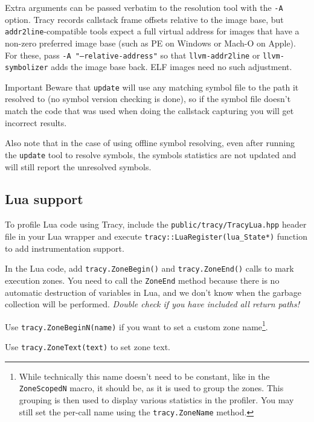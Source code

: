 \documentclass[hidelinks,titlepage,a4paper,twoside]{article}
\begin{document}
Extra arguments can be passed verbatim to the resolution tool with the \texttt{-A} option. Tracy
records callstack frame offsets relative to the image base, but \texttt{addr2line}-compatible
tools expect a full virtual address for images that have a non-zero preferred image base (such as
PE on Windows or Mach-O on Apple). For these, pass \texttt{-A "--relative-address"} so that
\texttt{llvm-addr2line} or \texttt{llvm-symbolizer} adds the image base back. ELF images need no
such adjustment.

\begin{bclogo}[
noborder=true,
couleur=black!5,
logo=\bcbombe
]{Important}
Beware that \texttt{update} will use any matching symbol file to the path it resolved to (no symbol version checking is done), so if the symbol file doesn't match the code that was used when doing the callstack capturing you will get incorrect results.

Also note that in the case of using offline symbol resolving, even after running the \texttt{update} tool to resolve symbols, the symbols statistics are not updated and will still report the unresolved symbols.
\end{bclogo}

\subsection{Lua support}

To profile Lua code using Tracy, include the \texttt{public/tracy/TracyLua.hpp} header file in your Lua wrapper and execute \texttt{tracy::LuaRegister(lua\_State*)} function to add instrumentation support.

In the Lua code, add \texttt{tracy.ZoneBegin()} and \texttt{tracy.ZoneEnd()} calls to mark execution zones. You need to call the \texttt{ZoneEnd} method because there is no automatic destruction of variables in Lua, and we don't know when the garbage collection will be performed. \emph{Double check if you have included all return paths!}

Use \texttt{tracy.ZoneBeginN(name)} if you want to set a custom zone name\footnote{While technically this name doesn't need to be constant, like in the \texttt{ZoneScopedN} macro, it should be, as it is used to group the zones. This grouping is then used to display various statistics in the profiler. You may still set the per-call name using the \texttt{tracy.ZoneName} method.}.

Use \texttt{tracy.ZoneText(text)} to set zone text.
\end{document}
